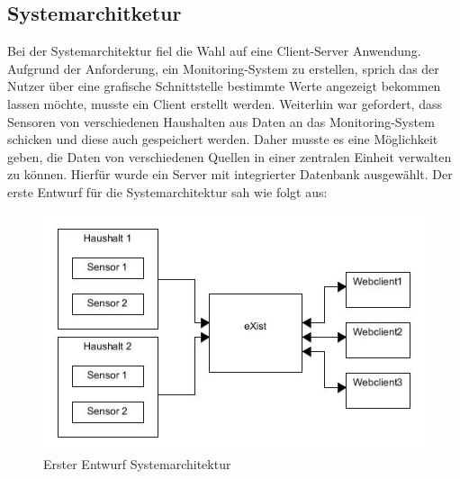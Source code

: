 \subsection{Systemarchitketur}
\label{subsec:Systemarchitketur}
Bei der Systemarchitektur fiel die Wahl auf eine Client-Server Anwendung. Aufgrund der Anforderung, ein Monitoring-System zu erstellen, sprich das der Nutzer über eine grafische Schnittstelle bestimmte Werte angezeigt bekommen lassen möchte, musste ein Client erstellt werden. Weiterhin war gefordert, dass Sensoren von verschiedenen Haushalten aus Daten an das Monitoring-System schicken und diese auch gespeichert werden. Daher musste es eine Möglichkeit geben, die Daten von verschiedenen Quellen in einer zentralen Einheit verwalten zu können. Hierfür wurde ein Server mit integrierter Datenbank ausgewählt. Der erste Entwurf für die Systemarchitektur sah wie folgt aus:

\begin{figure}[h]
\begin{center}
\includegraphics[scale=0.7]{images/sa1.jpg} 
\caption{Erster Entwurf Systemarchitektur}
\end{center}
\end{figure}

